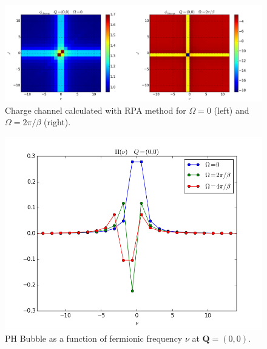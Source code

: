\begin{figure}
\includegraphics[scale=0.25]{images/Perp_ladder_density.png}
\caption{Charge channel calculated with RPA method for $\Omega=0$ (left) and $\Omega=2\pi/\beta$ (right). }
 \label{Perpladder}
\end{figure}

\begin{figure}
\includegraphics[scale=0.7]{images/Bubble_ph.png}
\caption{PH Bubble as a function of fermionic frequency $\nu$ at $\boldsymbol{Q}=(0,0)$. }
 \label{bubble}
\end{figure}
